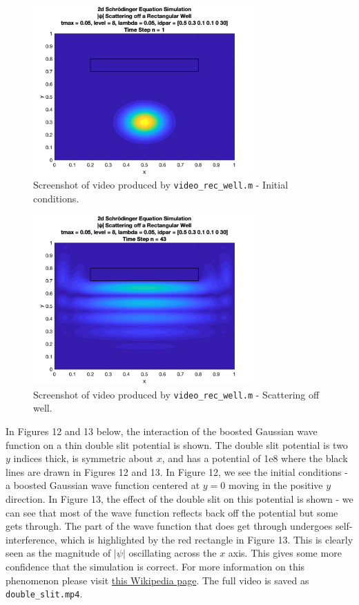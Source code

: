 \documentclass[10pt]{article}
\def\code#1{\texttt{#1}} %
\begin{document}
\begin{figure}[H]
\centering
\includegraphics[width=0.75\textwidth]{problem2/rec_well_1.png}
\caption{Screenshot of video produced by \code{video\_rec\_well.m} - Initial conditions.}
\end{figure}
\begin{figure}[H]
\centering
\includegraphics[width=0.75\textwidth]{problem2/rec_well_2.png}
\caption{Screenshot of video produced by \code{video\_rec\_well.m} - Scattering off well.}
\end{figure}

In Figures 12 and 13 below, the interaction of the boosted Gaussian wave function on a thin double
slit potential is shown. The double slit potential is two $y$ indices thick, is symmetric about $x$, 
and has a potential of 1e8 where the black lines are drawn in Figures 12 and 13. In Figure 12, we 
see the initial conditions - a boosted Gaussian wave function centered at $y=0$ moving in the 
positive $y$ direction. In Figure 13, the effect of the double slit on this potential is shown - we 
can see that most of the wave function reflects back off the potential but some gets through. The 
part of the wave function that does get through undergoes self-interference, which is highlighted by 
the red rectangle in Figure 13. This is clearly seen as the magnitude of $|\psi|$ oscillating across
the $x$ axis. This gives some more confidence that the simulation is correct. For more information 
on this phenomenon please visit 
\href{https://en.wikipedia.org/wiki/Double-slit_experiment}{this Wikipedia page}. The full video is 
saved as \code{double\_slit.mp4}.
\end{document}
